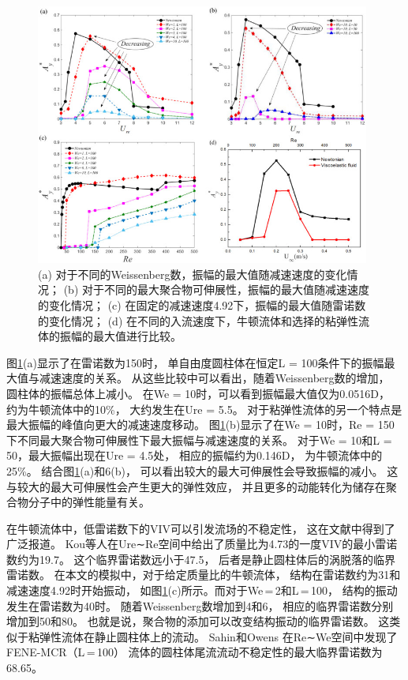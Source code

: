 \documentclass[UTF8,zihao=5]{ctexart} %
\begin{document}
\begin{figure}[H]
    \centering
    \includegraphics[width=11cm]{fig6.jpg}
    \caption{
        (a) 对于不同的Weissenberg数，振幅的最大值随减速速度的变化情况；
        (b) 对于不同的最大聚合物可伸展性，振幅的最大值随减速速度的变化情况；
        (c) 在固定的减速速度4.92下，振幅的最大值随雷诺数的变化情况；
        (d) 在不同的入流速度下，牛顿流体和选择的粘弹性流体的振幅的最大值进行比较。}
    \label{fig:6}
\end{figure}

图\ref{fig:6}(a)显示了在雷诺数为150时，
单自由度圆柱体在恒定L = 100条件下的振幅最大值与减速速度的关系。
从这些比较中可以看出，随着Weissenberg数的增加，
圆柱体的振幅总体上减小。
在We = 10时，可以看到振幅最大值仅为0.0516D，
约为牛顿流体中的10\%，
大约发生在Ure = 5.5。
对于粘弹性流体的另一个特点是最大振幅的峰值向更大的减速速度移动。
图\ref{fig:6}(b)显示了在We = 10时，Re = 150
下不同最大聚合物可伸展性下最大振幅与减速速度的关系。
对于We = 10和L = 50，最大振幅出现在Ure = 4.5处，
相应的振幅约为0.146D，
为牛顿流体中的25\%。
结合图\ref{fig:6}(a)和6(b)，
可以看出较大的最大可伸展性会导致振幅的减小。
这与较大的最大可伸展性会产生更大的弹性效应，
并且更多的动能转化为储存在聚合物分子中的弹性能量有关。


在牛顿流体中，低雷诺数下的VIV可以引发流场的不稳定性，
这在文献中得到了广泛报道。
Kou等人在Ure∼Re空间中给出了质量比为4.73的一度VIV的最小雷诺数约为19.7。
这个临界雷诺数远小于47.5，
后者是静止圆柱体后的涡脱落的临界雷诺数。
在本文的模拟中，对于给定质量比的牛顿流体，
结构在雷诺数约为31和减速速度4.92时开始振动，
如图\ref{fig:6}(c)所示。而对于We = 2和L = 100，
结构的振动发生在雷诺数为40时。
随着Weissenberg数增加到4和6，
相应的临界雷诺数分别增加到50和80。
也就是说，聚合物的添加可以改变结构振动的临界雷诺数。
这类似于粘弹性流体在静止圆柱体上的流动。
Sahin和Owens 在Re∼We空间中发现了FENE-MCR（L = 100）
流体的圆柱体尾流流动不稳定性的最大临界雷诺数为68.65。
\end{document}
